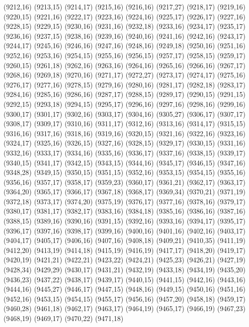 (9212,16)
(9213,15)
(9214,17)
(9215,16)
(9216,16)
(9217,27)
(9218,17)
(9219,16)
(9220,15)
(9221,16)
(9222,17)
(9223,16)
(9224,16)
(9225,17)
(9226,17)
(9227,16)
(9228,15)
(9229,15)
(9230,16)
(9231,16)
(9232,18)
(9233,16)
(9234,17)
(9235,17)
(9236,16)
(9237,15)
(9238,16)
(9239,16)
(9240,16)
(9241,16)
(9242,16)
(9243,17)
(9244,17)
(9245,16)
(9246,16)
(9247,16)
(9248,16)
(9249,18)
(9250,16)
(9251,16)
(9252,16)
(9253,16)
(9254,15)
(9255,16)
(9256,15)
(9257,17)
(9258,15)
(9259,17)
(9260,15)
(9261,18)
(9262,16)
(9263,16)
(9264,16)
(9265,16)
(9266,16)
(9267,17)
(9268,16)
(9269,18)
(9270,16)
(9271,17)
(9272,27)
(9273,17)
(9274,17)
(9275,16)
(9276,17)
(9277,16)
(9278,15)
(9279,16)
(9280,16)
(9281,17)
(9282,18)
(9283,17)
(9284,16)
(9285,16)
(9286,16)
(9287,17)
(9288,15)
(9289,17)
(9290,15)
(9291,15)
(9292,15)
(9293,18)
(9294,15)
(9295,17)
(9296,16)
(9297,16)
(9298,16)
(9299,16)
(9300,17)
(9301,17)
(9302,16)
(9303,17)
(9304,16)
(9305,27)
(9306,17)
(9307,17)
(9308,17)
(9309,17)
(9310,16)
(9311,17)
(9312,16)
(9313,16)
(9314,17)
(9315,15)
(9316,16)
(9317,16)
(9318,16)
(9319,16)
(9320,15)
(9321,16)
(9322,16)
(9323,16)
(9324,17)
(9325,16)
(9326,15)
(9327,16)
(9328,15)
(9329,17)
(9330,15)
(9331,16)
(9332,16)
(9333,17)
(9334,16)
(9335,16)
(9336,17)
(9337,16)
(9338,15)
(9339,17)
(9340,15)
(9341,17)
(9342,15)
(9343,15)
(9344,16)
(9345,17)
(9346,15)
(9347,16)
(9348,28)
(9349,15)
(9350,15)
(9351,15)
(9352,16)
(9353,15)
(9354,15)
(9355,16)
(9356,16)
(9357,17)
(9358,17)
(9359,23)
(9360,17)
(9361,21)
(9362,17)
(9363,17)
(9364,20)
(9365,17)
(9366,17)
(9367,18)
(9368,17)
(9369,34)
(9370,21)
(9371,19)
(9372,18)
(9373,17)
(9374,20)
(9375,19)
(9376,17)
(9377,16)
(9378,16)
(9379,17)
(9380,17)
(9381,17)
(9382,17)
(9383,16)
(9384,18)
(9385,16)
(9386,16)
(9387,16)
(9388,15)
(9389,16)
(9390,16)
(9391,15)
(9392,16)
(9393,16)
(9394,17)
(9395,17)
(9396,17)
(9397,16)
(9398,17)
(9399,16)
(9400,16)
(9401,16)
(9402,16)
(9403,17)
(9404,17)
(9405,17)
(9406,16)
(9407,16)
(9408,18)
(9409,21)
(9410,35)
(9411,19)
(9412,20)
(9413,19)
(9414,18)
(9415,19)
(9416,19)
(9417,17)
(9418,20)
(9419,17)
(9420,19)
(9421,21)
(9422,21)
(9423,22)
(9424,21)
(9425,23)
(9426,21)
(9427,19)
(9428,34)
(9429,29)
(9430,17)
(9431,21)
(9432,19)
(9433,18)
(9434,19)
(9435,20)
(9436,23)
(9437,22)
(9438,17)
(9439,17)
(9440,15)
(9441,15)
(9442,16)
(9443,16)
(9444,16)
(9445,27)
(9446,17)
(9447,15)
(9448,16)
(9449,15)
(9450,16)
(9451,16)
(9452,16)
(9453,15)
(9454,15)
(9455,17)
(9456,16)
(9457,20)
(9458,18)
(9459,17)
(9460,28)
(9461,18)
(9462,17)
(9463,17)
(9464,19)
(9465,17)
(9466,19)
(9467,23)
(9468,19)
(9469,17)
(9470,22)
(9471,18)
